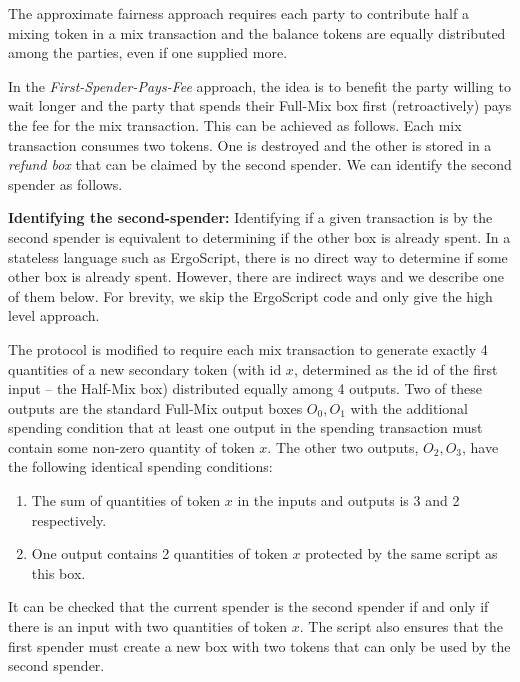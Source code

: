\documentclass[runningheads]{llncs}
\newcommand{\langname}{ErgoScript\xspace}
\begin{document}
The approximate fairness approach requires each party to contribute half a mixing token in a mix transaction and the balance tokens are equally distributed among the parties, even if one supplied more. 


In the {\em First-Spender-Pays-Fee} approach, the idea is to benefit the party willing to wait longer and the party that spends their Full-Mix box first (retroactively) pays the fee for the mix transaction. This can be achieved as follows. Each mix transaction consumes two tokens. One is destroyed and the other is stored in a {\em refund box} that can be claimed by the second spender. We can identify the second spender as follows. 

\textbf{Identifying the second-spender:} Identifying if a given transaction is by the second spender is equivalent to determining if the other box is already spent. In a stateless language such as \langname, there is no direct way to determine if some other box is already spent. However, there are indirect ways and we describe one of them below. For brevity, we skip the \langname code and only give the high level approach. 

The protocol is modified to require each mix transaction to generate exactly 4 quantities of a new secondary token (with id $x$, determined as the id of the first input -- the Half-Mix box) distributed equally among 4 outputs. Two of these outputs are the standard Full-Mix output boxes $O_0, O_1$ with the additional spending condition that at least one output in the spending transaction must contain some non-zero quantity of token $x$. The other two outputs, $O_2, O_3$, have the following identical spending conditions:
\begin{enumerate}
	\item The sum of quantities of token $x$ in the inputs and outputs is 3 and 2 respectively.
	\item One output contains 2 quantities of token $x$ protected by the same script as this box. 
\end{enumerate}

It can be checked that the current spender is the second spender if and only if there is an input with two quantities of token $x$. The script also ensures that the first spender must create a new box with two tokens that can only be used by the second spender.
\end{document}
